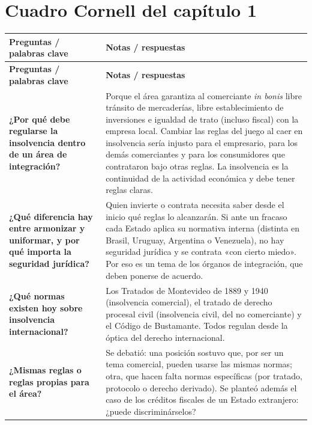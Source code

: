 \documentclass[12pt,oneside]{book}
\begin{document}

\section{Cuadro Cornell del capítulo 1}

\begin{longtable}{
    >{\raggedright\arraybackslash}p{}
    >{\raggedright\arraybackslash}p{}
}
\toprule
\textbf{Preguntas / palabras clave} &
\textbf{Notas / respuestas} \\
\midrule
\endfirsthead
\toprule
\textbf{Preguntas / palabras clave} &
\textbf{Notas / respuestas} \\
\midrule
\endhead
\bottomrule
\endfoot
\bottomrule
\endlastfoot

\textbf{¿Por qué debe regularse la insolvencia dentro de un área de integración?} &
Porque el área garantiza al comerciante \textit{in bonis} libre tránsito de mercaderías, libre establecimiento de inversiones e igualdad de trato (incluso fiscal) con la empresa local. Cambiar las reglas del juego al caer en insolvencia sería injusto para el empresario, para los demás comerciantes y para los consumidores que contrataron bajo otras reglas. La insolvencia es la continuidad de la actividad económica y debe tener reglas claras. \\

\textbf{¿Qué diferencia hay entre armonizar y uniformar, y por qué importa la seguridad jurídica?} &
Quien invierte o contrata necesita saber desde el inicio qué reglas lo alcanzarán. Si ante un fracaso cada Estado aplica su normativa interna (distinta en Brasil, Uruguay, Argentina o Venezuela), no hay seguridad jurídica y se contrata «con cierto miedo». Por eso es un tema de los órganos de integración, que deben ponerse de acuerdo. \\

\textbf{¿Qué normas existen hoy sobre insolvencia internacional?} &
Los Tratados de Montevideo de 1889 y 1940 (insolvencia comercial), el tratado de derecho procesal civil (insolvencia civil, del no comerciante) y el Código de Bustamante. Todos regulan desde la óptica del derecho internacional. \\

\textbf{¿Mismas reglas o reglas propias para el área?} &
Se debatió: una posición sostuvo que, por ser un tema comercial, pueden usarse las mismas normas; otra, que hacen falta normas específicas (por tratado, protocolo o derecho derivado). Se planteó además el caso de los créditos fiscales de un Estado extranjero: ¿puede discriminárselos? \\


\end{longtable}
\end{document}

